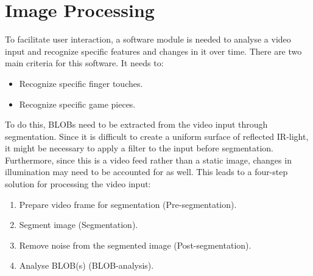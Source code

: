 \section{Image Processing}
To facilitate user interaction, a software module is needed to analyse a video input and recognize specific features and changes in it over time. There are two main criteria for this software. It needs to:
\begin{itemize}
\item Recognize specific finger touches.
\item Recognize specific game pieces.
\end{itemize}

To do this, BLOBs need to be extracted from the video input through segmentation. Since it is difficult to create a uniform surface of reflected IR-light, it might be necessary to apply a filter to the input before segmentation. Furthermore, since this is a video feed rather than a static image, changes in illumination may need to be accounted for as well. This leads to a four-step solution for processing the video input:
\begin{enumerate}
\item Prepare video frame for segmentation (Pre-segmentation).
\item Segment image (Segmentation).
\item Remove noise from the segmented image (Post-segmentation).
\item Analyse BLOB(s) (BLOB-analysis).
\end{enumerate}

